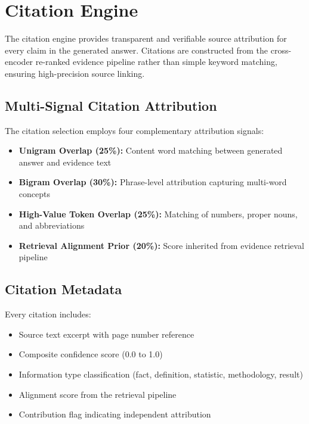 \documentclass[11pt,a4paper]{article}
\begin{document}
\clearpage
\section{Citation Engine}

The citation engine provides transparent and verifiable source attribution for every claim in the generated answer. Citations are constructed from the cross-encoder re-ranked evidence pipeline rather than simple keyword matching, ensuring high-precision source linking.

\subsection{Multi-Signal Citation Attribution}

The citation selection employs four complementary attribution signals:

\begin{itemize}[leftmargin=*]
    \item \textbf{Unigram Overlap (25\%):} Content word matching between generated answer and evidence text
    \item \textbf{Bigram Overlap (30\%):} Phrase-level attribution capturing multi-word concepts
    \item \textbf{High-Value Token Overlap (25\%):} Matching of numbers, proper nouns, and abbreviations
    \item \textbf{Retrieval Alignment Prior (20\%):} Score inherited from evidence retrieval pipeline
\end{itemize}

\subsection{Citation Metadata}

Every citation includes:
\begin{itemize}[leftmargin=*]
    \item Source text excerpt with page number reference
    \item Composite confidence score (0.0 to 1.0)
    \item Information type classification (fact, definition, statistic, methodology, result)
    \item Alignment score from the retrieval pipeline
    \item Contribution flag indicating independent attribution
\end{itemize}
\end{document}
